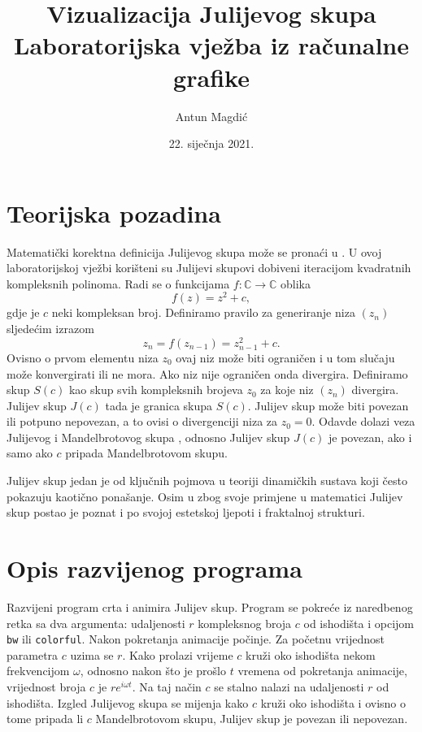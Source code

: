 \documentclass[a4paper]{article}
\title{\textbf{Vizualizacija Julijevog skupa} \\ 
      {\large Laboratorijska vježba iz računalne grafike}}
\author{Antun Magdić}
\date{22. siječnja 2021.}
\begin{document}
\maketitle

\section{Teorijska pozadina}

Matematički korektna definicija Julijevog skupa može se pronaći u 
\cite{juliaset}. U ovoj laboratorijskoj vježbi korišteni su Julijevi skupovi
dobiveni iteracijom kvadratnih kompleksnih polinoma. Radi se o funkcijama 
$f: \mathbb{C} \rightarrow \mathbb{C}$ oblika
$$f(z) = z^2 + c,$$
gdje je $c$ neki kompleksan broj. Definiramo pravilo za generiranje niza $(z_n)$
sljedećim izrazom 
$$z_n = f(z_{n-1}) = z_{n-1}^2 + c.$$
Ovisno o prvom elementu niza $z_0$ ovaj niz može biti ograničen i u tom slučaju 
može konvergirati ili ne mora. Ako niz nije ograničen onda divergira. Definiramo
skup $S(c)$ kao skup svih kompleksnih brojeva $z_0$ za koje niz $(z_n)$ 
divergira. Julijev skup $J(c)$ tada je granica skupa $S(c)$. Julijev skup može 
biti povezan ili potpuno nepovezan, a to ovisi o divergenciji niza za $z_0 = 0$. 
Odavde dolazi veza Julijevog i Mandelbrotovog skupa \cite{mandelbrotset}, 
odnosno Julijev skup $J(c)$ je povezan, ako i samo ako $c$ pripada 
Mandelbrotovom skupu.

Julijev skup jedan je od ključnih pojmova u teoriji dinamičkih sustava koji 
često pokazuju kaotično ponašanje. Osim u zbog svoje primjene u matematici 
Julijev skup postao je poznat i po svojoj estetskoj ljepoti i fraktalnoj 
strukturi.

\section{Opis razvijenog programa}

Razvijeni program crta i animira Julijev skup. Program se pokreće iz naredbenog 
retka sa dva argumenta: udaljenosti $r$ kompleksnog broja $c$ od ishodišta i 
opcijom \texttt{bw} ili \texttt{colorful}. Nakon pokretanja animacije počinje.
Za početnu vrijednost parametra $c$ uzima se $r$. Kako prolazi vrijeme $c$ kruži
oko ishodišta nekom frekvencijom $\omega$, odnosno nakon što je prošlo $t$ 
vremena od pokretanja animacije, vrijednost broja $c$ je $r e^{i \omega t}$. Na 
taj način $c$ se stalno nalazi na udaljenosti $r$ od ishodišta. Izgled Julijevog
skupa se mijenja kako $c$ kruži oko ishodišta i ovisno o tome pripada li $c$
Mandelbrotovom skupu, Julijev skup je povezan ili nepovezan.
\end{document}
